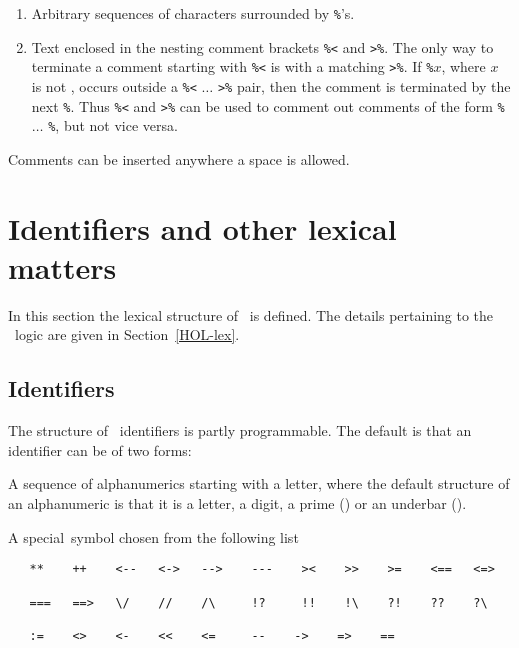 \begin{enumerate}
\begin{enumerate}
\item Arbitrary sequences of
characters surrounded by 
{\small\verb$%$}'s.

\item Text enclosed in the nesting comment brackets
{\small\verb$%<$}
 and {\small\verb$>%$}.
The only way to terminate a comment starting with {\small\verb$%<$} is
with a matching {\small\verb$>%$}. 
If {\small\verb$%$}$x$, where $x$ is not \ml{<}, 
occurs outside a {\small\verb$%<$} $\ldots$ {\small\verb$>%$} pair,
then the comment is terminated by the next {\small\verb$%$}. 
Thus {\small\verb$%<$} and {\small\verb$>%$} 
can be used to comment out comments of the form 
{\small\verb$%$} $\ldots$ {\small\verb$%$}, but not
vice versa.
\end{enumerate}

Comments can be inserted anywhere a space is allowed.

\end{enumerate}



\section{Identifiers and other lexical matters}\label{ML-ident}

In this section the lexical structure of \ML\ is defined. The
details pertaining to the \HOL\ logic are given in Section~\ref{HOL-lex}.

\subsection{Identifiers}

The structure of \ML\ 
identifiers
is partly programmable. The default
is that an identifier can be of two forms:
\begin{myenumerate}
\item A sequence of alphanumerics starting with a letter, 
where the default structure of an alphanumeric is that it is a letter, 
a digit, a prime (\ml{`}) or an underbar (\ty{\_}).
\item A 
special~symbol
chosen from the following list

{\small\begin{verbatim}
   **    ++    <--   <->   -->    ---    ><    >>    >=    <==   <=>

   ===   ==>   \/    //    /\     !?     !!    !\    ?!    ??    ?\

   :=    <>    <-    <<    <=     --    ->    =>    ==
\end{verbatim}}

\end{myenumerate}

